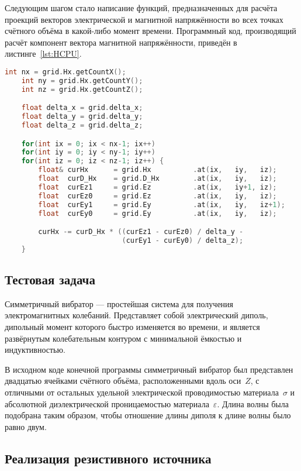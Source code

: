 Следующим шагом стало написание функций, предназначенных для расчёта проекций векторов электрической и магнитной напряжённости во всех точках счётного объёма в какой-либо момент времени. Программный код, производящий расчёт компонент вектора магнитной напряжённости, приведён в листинге~\ref{lst:HCPU}.

\begin{lstlisting}[caption={Код расчёта компоненты вектора магнитной напряжённости на ЦПУ},label={lst:HCPU},language=C++, float, floatplacement=p]
    int nx = grid.Hx.getCountX();
    int ny = grid.Hx.getCountY();
    int nz = grid.Hx.getCountZ();

    float delta_x = grid.delta_x;
    float delta_y = grid.delta_y;
    float delta_z = grid.delta_z;

    for(int ix = 0; ix < nx-1; ix++)
    for(int iy = 0; iy < ny-1; iy++)
    for(int iz = 0; iz < nz-1; iz++) {
        float& curHx      = grid.Hx          .at(ix,   iy,   iz);
        float  curD_Hx    = grid.D_Hx        .at(ix,   iy,   iz);
        float  curEz1     = grid.Ez          .at(ix,   iy+1, iz);
        float  curEz0     = grid.Ez          .at(ix,   iy,   iz);
        float  curEy1     = grid.Ey          .at(ix,   iy,   iz+1);
        float  curEy0     = grid.Ey          .at(ix,   iy,   iz);

        curHx -= curD_Hx * ((curEz1 - curEz0) / delta_y -
                            (curEy1 - curEy0) / delta_z);
    }
\end{lstlisting}

\subsection{Тестовая задача}

Симметричный вибратор --- простейшая система для получения электромагнитных колебаний. Представляет собой электрический диполь, дипольный момент которого быстро изменяется во времени, и является развёрнутым колебательным контуром с минимальной ёмкостью и индуктивностью.

В исходном коде конечной программы симметричный вибратор был представлен двадцатью ячейками счётного объёма, расположенными вдоль оси~$ Z $, с отличными от остальных удельной электрической проводимостью материала~$\sigma$
и абсолютной диэлектрической проницаемостью материала~$\varepsilon$. Длина волны была подобрана таким образом, чтобы отношение длины диполя к длине волны было равно двум.

\subsection{Реализация резистивного источника}

